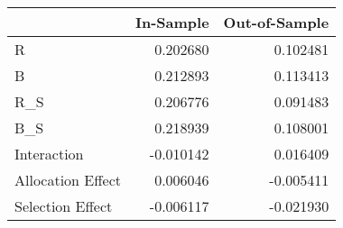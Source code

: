 \begin{tabular}{lrr}
\toprule
{} &  In-Sample &  Out-of-Sample \\
\midrule
R                 &   0.202680 &       0.102481 \\
B                 &   0.212893 &       0.113413 \\
R\_S               &   0.206776 &       0.091483 \\
B\_S               &   0.218939 &       0.108001 \\
Interaction       &  -0.010142 &       0.016409 \\
Allocation Effect &   0.006046 &      -0.005411 \\
Selection Effect  &  -0.006117 &      -0.021930 \\
\bottomrule
\end{tabular}
